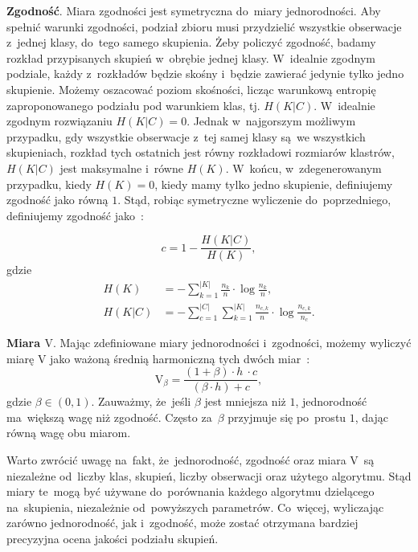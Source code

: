 \documentclass{praca1}
\begin{document}
\textbf{Zgodność}. Miara zgodności jest symetryczna do~miary jednorodności. Aby spełnić warunki zgodności, podział zbioru musi przydzielić wszystkie obserwacje z~jednej klasy, do~tego samego skupienia. Żeby policzyć zgodność, badamy rozkład przypisanych skupień w~obrębie jednej klasy. W~idealnie zgodnym podziale, każdy z~rozkładów będzie skośny i~będzie zawierać jedynie tylko jedno skupienie. Możemy oszacować poziom skośności, licząc warunkową entropię zaproponowanego podziału pod warunkiem klas, tj. $H(K|C)$. W~idealnie zgodnym rozwiązaniu $H(K|C) = 0$. Jednak w~najgorszym możliwym przypadku, gdy wszystkie obserwacje z~tej samej klasy są~we wszystkich skupieniach, rozkład tych ostatnich jest równy rozkładowi rozmiarów klastrów, $H(K|C)$ jest maksymalne i~równe $H(K)$. W~końcu, w~zdegenerowanym przypadku, kiedy $H(K) = 0$, kiedy mamy tylko jedno skupienie, definiujemy zgodność jako równą $1$. Stąd, robiąc symetryczne wyliczenie do~poprzedniego, definiujemy zgodność jako~\cite{Rosenberg2007:vmeasure}:

\begin{equation}
c = %
1 - \frac{H(K|C)}{H(K)}, %
\end{equation}
gdzie
\begin{align*}
H(K) & = - \sum\limits_{k = 1}^{|K|}\frac{n_k}{n}\cdot \log{\frac{n_k}{n}},  \\
H(K|C) & = - \sum\limits_{c = 1}^{|C|}\sum\limits_{k = 1}^{|K|}\frac{n_{c,k}}{n}\cdot \log{\frac{n_{c,k}}{n_c}}.
\end{align*}

\textbf{Miara $\textrm{V}$}. Mając zdefiniowane miary jednorodności i~zgodności, możemy wyliczyć miarę $\textrm{V}$ jako ważoną średnią harmoniczną tych dwóch miar~\cite{Rosenberg2007:vmeasure}:
\begin{equation}
\textrm{V}_{\beta} = \frac{(1+\beta)\cdot h~\cdot c}{(\beta \cdot h) + c},
\end{equation}
gdzie $\beta \in (0,1)$. Zauważmy, że~jeśli $\beta$ jest mniejsza niż $1$, jednorodność ma~większą wagę niż zgodność. Często za~$\beta$ przyjmuje się po~prostu $1$, dając równą wagę obu miarom.

Warto zwrócić uwagę na~fakt, że~jednorodność, zgodność oraz miara V~są niezależne od~liczby klas, skupień, liczby obserwacji oraz użytego algorytmu. Stąd miary te~mogą być używane do~porównania każdego algorytmu dzielącego na~skupienia, niezależnie od~powyższych parametrów. Co~więcej, wyliczając zarówno jednorodność, jak i~zgodność, może zostać otrzymana bardziej precyzyjna ocena jakości podziału skupień.
\end{document}
